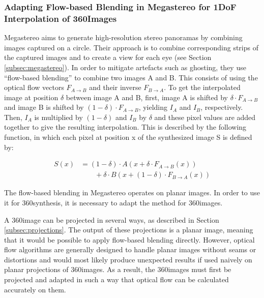 
\subsubsection{Adapting Flow-based Blending in Megastereo for 1DoF Interpolation of 360\degree Images}
Megastereo \cite{megastereo} aims to generate high-resolution stereo panoramas by combining images captured on a circle. Their approach is to combine corresponding strips of the captured images and to create a view for each eye (see Section \ref{subsec:megastereo}). In order to mitigate artefacts such as ghosting, they use ``flow-based blending'' to combine two images A and B. This consists of using the optical flow vectors $F_{A\rightarrow B}$ and their inverse $F_{B\rightarrow A}$. To get the interpolated image at position $\delta$ between image A and B, first, image A is shifted by $\delta \cdot F_{A\to B}$ and image B is shifted by $(1 - \delta) \cdot F_{A\to B}$, yielding $I_A$ and $I_B$, respectively. Then, $I_A$ is multiplied by $(1-\delta)$ and $I_B$ by $\delta$ and these pixel values are added together to give the resulting interpolation. This is described by the following function, in which each pixel at position x of the synthesized image S is defined by: 

\begin{align}
S(x) &= (1-\delta ) \cdot A( x + \delta \cdot F_{A\to B}(x)) \nonumber\\
     &\qquad {} + \delta \cdot B( x + (1-\delta) \cdot F_{B\to A}(x)) \label{eq:flow_blending}
   \end{align}

The flow-based blending in Megastereo operates on planar images. In order to use it for 360\degree synthesis, it is necessary to adapt the method for 360\degree images.

A 360\degree image can be projected in several ways, as described in Section \ref{subsec:projections}. The output of these projections is a planar image, meaning that it would be possible to apply flow-based blending directly. However, optical flow algorithms are generally designed to handle planar images without seams or distortions and would most likely produce unexpected results if used naively on planar projections of 360\degree images. As a result, the 360\degree images must first be projected and adapted in such a way that optical flow can be calculated accurately on them.

